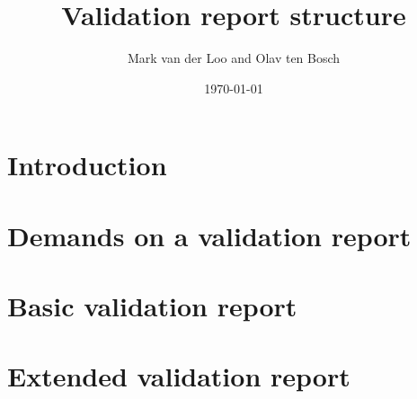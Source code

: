 \documentclass[a4paper, 11pt]{article}
\title{Validation report structure}
\author{Mark van der Loo and Olav ten Bosch}
\date{\today}
\begin{document}
\maketitle{}


\section{Introduction}

\section{Demands on a validation report}


\section{Basic validation report}



\section{Extended validation report}
\end{document}
